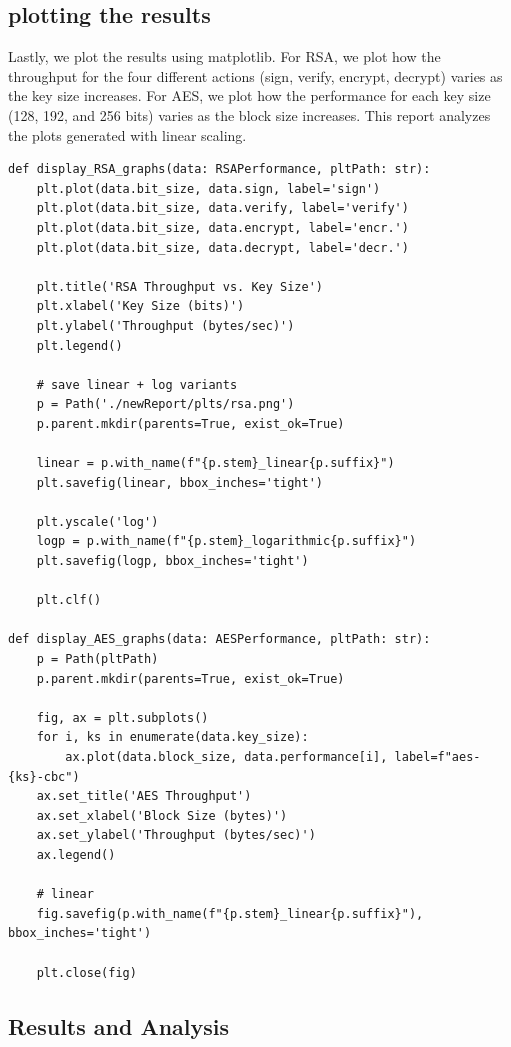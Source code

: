 \documentclass[11pt]{article}
\begin{document}
\subsection*{plotting the results}
Lastly, we plot the results using matplotlib. For RSA, we plot how the throughput for the four different actions (sign, verify, encrypt, decrypt) varies as the key size increases. For AES, we plot how the performance for each key size (128, 192, and 256 bits) varies as the block size increases. This report analyzes the plots generated with linear scaling.
\begin{framed}
\begin{verbatim}
def display_RSA_graphs(data: RSAPerformance, pltPath: str): 
    plt.plot(data.bit_size, data.sign, label='sign')
    plt.plot(data.bit_size, data.verify, label='verify')
    plt.plot(data.bit_size, data.encrypt, label='encr.')
    plt.plot(data.bit_size, data.decrypt, label='decr.')

    plt.title('RSA Throughput vs. Key Size')
    plt.xlabel('Key Size (bits)')
    plt.ylabel('Throughput (bytes/sec)')
    plt.legend()
       
    # save linear + log variants
    p = Path('./newReport/plts/rsa.png')
    p.parent.mkdir(parents=True, exist_ok=True)

    linear = p.with_name(f"{p.stem}_linear{p.suffix}")
    plt.savefig(linear, bbox_inches='tight')

    plt.yscale('log')
    logp = p.with_name(f"{p.stem}_logarithmic{p.suffix}")
    plt.savefig(logp, bbox_inches='tight')

    plt.clf()

def display_AES_graphs(data: AESPerformance, pltPath: str):
    p = Path(pltPath)
    p.parent.mkdir(parents=True, exist_ok=True)

    fig, ax = plt.subplots()
    for i, ks in enumerate(data.key_size):
        ax.plot(data.block_size, data.performance[i], label=f"aes-{ks}-cbc")
    ax.set_title('AES Throughput')
    ax.set_xlabel('Block Size (bytes)')
    ax.set_ylabel('Throughput (bytes/sec)')
    ax.legend()

    # linear
    fig.savefig(p.with_name(f"{p.stem}_linear{p.suffix}"), bbox_inches='tight')

    plt.close(fig)

\end{verbatim}
\end{framed}

\subsection*{Results and Analysis}
\end{document}
